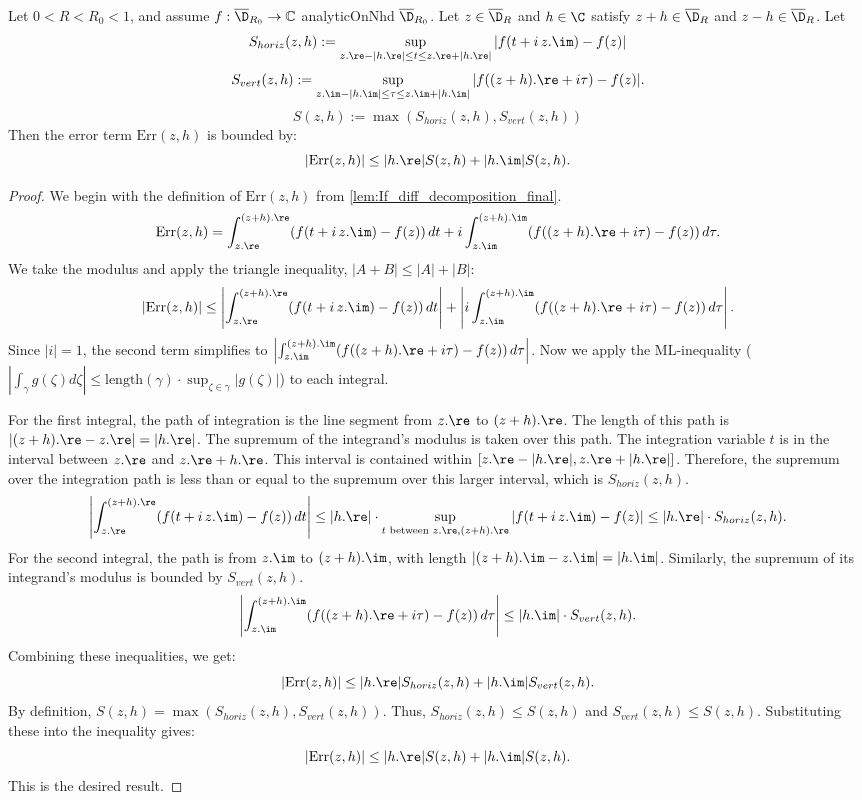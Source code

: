 \begin{lemma}\label{lem:bound_on_Err}
\leanok
Let $0<R<R_0<1$, and assume $f:\overline{\D}_{R_0}\to\mathbb{C}$ analyticOnNhd $\overline{\D}_{R_0}$. Let $z \in \overline{\D}_R$ and $h\in\C$ satisfy $z+h \in \overline{\D}_R$ and $z-h \in \overline{\D}_R$. Let
\[ S_{horiz}(z,h) := \sup_{z.\re - |h.\re| \le t \le z.\re + |h.\re|} |f(t + i\,z.\im) - f(z)| \]
\[ S_{vert}(z,h) := \sup_{z.\im - |h.\im|  \le \tau \le z.\im + |h.\im|} |f((z+h).\re + i\tau) - f(z)|.\]
\[ S(z,h) := \max(S_{horiz}(z,h),S_{vert}(z,h))\]
Then the error term $\mathrm{Err}(z,h)$ is bounded by:
\[ |\mathrm{Err}(z,h)| \le |h.\re| S(z,h) + |h.\im|S(z,h). \]
\end{lemma}
\begin{proof}
\leanok
We begin with the definition of $\mathrm{Err}(z,h)$ from \cref{lem:If_diff_decomposition_final}.
\[ \mathrm{Err}(z,h) = \int_{z.\re}^{(z+h).\re} (f(t + i\,z.\im) - f(z))\,dt + i \int_{z.\im}^{(z+h).\im} (f((z+h).\re + i\tau) - f(z))\,d\tau. \]
We take the modulus and apply the triangle inequality, $|A+B| \le |A| + |B|$:
\[ |\mathrm{Err}(z,h)| \le \left| \int_{z.\re}^{(z+h).\re} (f(t + i\,z.\im) - f(z))\,dt \right| + \left| i \int_{z.\im}^{(z+h).\im} (f((z+h).\re + i\tau) - f(z))\,d\tau \right|. \]
Since $|i|=1$, the second term simplifies to $\left| \int_{z.\im}^{(z+h).\im} (f((z+h).\re + i\tau) - f(z))\,d\tau \right|$.
Now we apply the ML-inequality ($|\int_\gamma g(\zeta)d\zeta| \le \text{length}(\gamma) \cdot \sup_{\zeta \in \gamma} |g(\zeta)|$) to each integral.

For the first integral, the path of integration is the line segment from $z.\re$ to $(z+h).\re$. The length of this path is $|(z+h).\re - z.\re| = |h.\re|$. The supremum of the integrand's modulus is taken over this path. The integration variable $t$ is in the interval between $z.\re$ and $z.\re+h.\re$. This interval is contained within $[z.\re - |h.\re|, z.\re + |h.\re|]$. Therefore, the supremum over the integration path is less than or equal to the supremum over this larger interval, which is $S_{horiz}(z,h)$.
\[ \left| \int_{z.\re}^{(z+h).\re} (f(t + i\,z.\im) - f(z))\,dt \right| \le |h.\re| \cdot \sup_{t \text{ between } z.\re, (z+h).\re} |f(t + i\,z.\im) - f(z)| \le |h.\re| \cdot S_{horiz}(z,h). \]
For the second integral, the path is from $z.\im$ to $(z+h).\im$, with length $|(z+h).\im - z.\im| = |h.\im|$. Similarly, the supremum of its integrand's modulus is bounded by $S_{vert}(z,h)$.
\[ \left| \int_{z.\im}^{(z+h).\im} (f((z+h).\re + i\tau) - f(z))\,d\tau \right| \le |h.\im| \cdot S_{vert}(z,h). \]
Combining these inequalities, we get:
\[ |\mathrm{Err}(z,h)| \le |h.\re| S_{horiz}(z,h) + |h.\im| S_{vert}(z,h). \]
By definition, $S(z,h) = \max(S_{horiz}(z,h), S_{vert}(z,h))$. Thus, $S_{horiz}(z,h) \le S(z,h)$ and $S_{vert}(z,h) \le S(z,h)$. Substituting these into the inequality gives:
\[ |\mathrm{Err}(z,h)| \le |h.\re| S(z,h) + |h.\im| S(z,h). \]
This is the desired result.
\end{proof}

